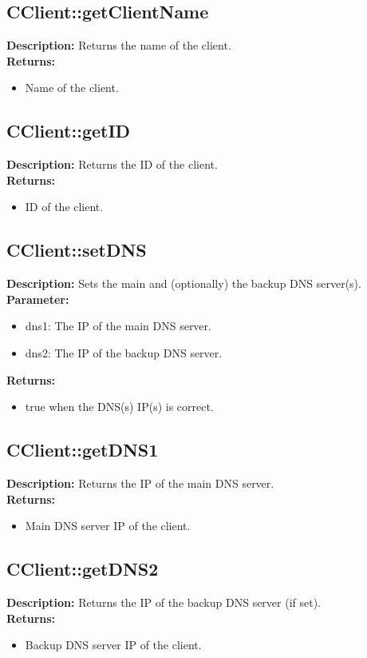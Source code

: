\subsection{CClient::getClientName}
\textbf{Description:} Returns the name of the client.\\
\textbf{Returns:}
\begin{itemize}
\item Name of the client.
\end{itemize}

\subsection{CClient::getID}
\textbf{Description:} Returns the ID of the client.\\
\textbf{Returns:}
\begin{itemize}
\item ID of the client.
\end{itemize}

\subsection{CClient::setDNS}
\textbf{Description:} Sets the main and (optionally) the backup DNS server(s).\\
\textbf{Parameter:}
\begin{itemize}
\item dns1: The IP of the main DNS server.
\item dns2: The IP of the backup DNS server.
\end{itemize}
\textbf{Returns:}
\begin{itemize}
\item true when the DNS(s) IP(s) is correct.
\end{itemize}

\subsection{CClient::getDNS1}
\textbf{Description:} Returns the IP of the main DNS server.\\
\textbf{Returns:}
\begin{itemize}
\item Main DNS server IP of the client.
\end{itemize}

\subsection{CClient::getDNS2}
\textbf{Description:} Returns the IP of the backup DNS server (if set).\\
\textbf{Returns:}
\begin{itemize}
\item Backup DNS server IP of the client.
\end{itemize}


